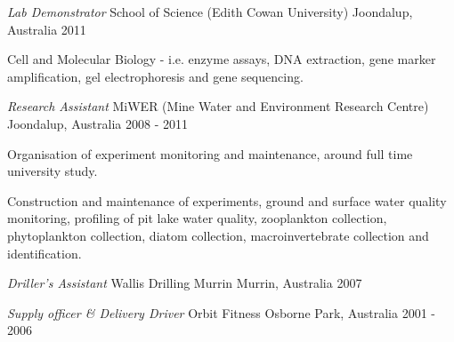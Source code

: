 \begin{cventries}
  \cventry
    {\emph{Lab Demonstrator}} %
    {School of Science (Edith Cowan University)} %
    {Joondalup, Australia} %
    {2011} %
    {
	\begin{cvitems} %
		\item {Cell and Molecular Biology - i.e. enzyme assays, DNA extraction, gene marker amplification, gel electrophoresis and gene sequencing.}
	\end{cvitems}
    }

  \cventry
    {\emph{Research Assistant}} %
    {MiWER (Mine Water and Environment Research Centre)} %
    {Joondalup, Australia} %
    {2008 - 2011} %
    {
      \begin{cvitems} %
        \item {Organisation of experiment monitoring and maintenance, around full time university study.}
        \item {Construction and maintenance of experiments, ground and surface water quality monitoring, profiling of pit lake water quality, zooplankton collection, phytoplankton collection, diatom collection, macroinvertebrate collection and identification.}
      \end{cvitems}
    }

  \cventry
    {\emph{Driller's Assistant}} %
    {Wallis Drilling} %
    {Murrin Murrin, Australia} %
    {2007} %
    {
    }

  \cventry
    {\emph{Supply officer \& Delivery Driver}} %
    {Orbit Fitness} %
    {Osborne Park, Australia} %
    {2001 - 2006} %
    {
    }

\end{cventries}
